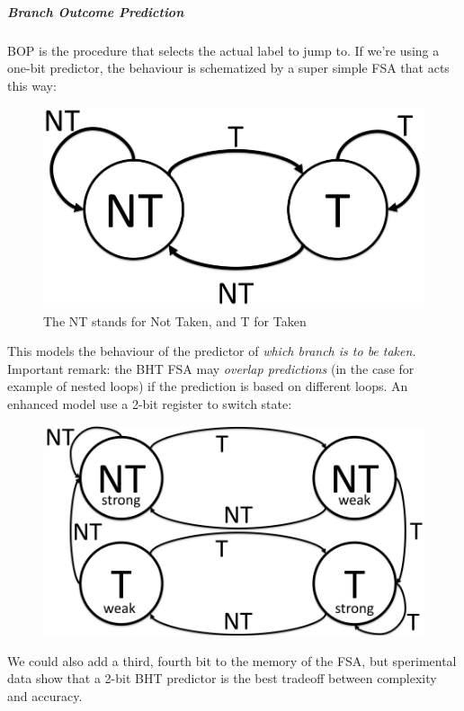 \documentclass[10pt,a4paper]{article}
\begin{document}
						\subparagraph{Branch Outcome Prediction}
							BOP is the procedure that selects the actual label to jump to. If we're using a one-bit predictor, the behaviour is schematized by a super simple FSA that acts this way:
							\begin{figure}[H]
								\centering
								\includegraphics[width = \textwidth]{./images/BHTFSA.png}
								\caption{The NT stands for Not Taken, and T for Taken}
							\end{figure}
							This models the behaviour of the predictor of \emph{which branch is to be taken}.\\
							Important remark: the BHT FSA may \emph{overlap predictions} (in the case for example of nested loops) if the prediction is based on different loops. An enhanced model use a 2-bit register to switch state:
							\begin{figure}[H]
								\centering
								\includegraphics[width = \textwidth]{./images/BHTFSA2.png}
							\end{figure}
							We could also add a third, fourth bit to the memory of the FSA, but sperimental data show that a 2-bit BHT predictor is the best tradeoff between complexity and accuracy.\\
\end{document}

